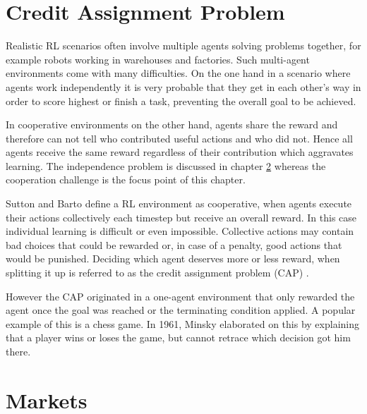 \section{Credit Assignment Problem}
Realistic RL scenarios often involve multiple agents solving problems together, for
example robots working in warehouses and factories. Such multi-agent environments come
with many difficulties. On the one hand
in a scenario where agents work independently it is very probable that they get in
each other's way in order to score highest or finish a task, preventing the overall
goal to be achieved.


In cooperative environments on the other hand, agents share the reward and therefore
can not tell who contributed useful actions and who did not. Hence all agents receive
the same reward regardless of their contribution which aggravates learning.
The independence problem is discussed in chapter \ref{market}
whereas the cooperation challenge is the focus point of this chapter.

Sutton and Barto \cite{suba18} define a RL environment as cooperative, when agents
execute their actions collectively each timestep but receive an overall reward. In
this case individual learning is difficult or even impossible. Collective actions may
contain bad choices that could be rewarded or, in case of a penalty, good actions
that would be punished. Deciding which agent deserves more or less reward, when
splitting it up is referred to as the credit assignment problem (CAP) \cite{mi61}.

However the CAP originated in a one-agent environment that only rewarded the agent once
the goal was reached or the terminating condition applied. A popular example of this is
a chess game. In 1961, Minsky \cite{mi61} elaborated on this by explaining that a
player wins or loses the game, but cannot retrace which decision got him there.

\section{Markets}\label{market}
